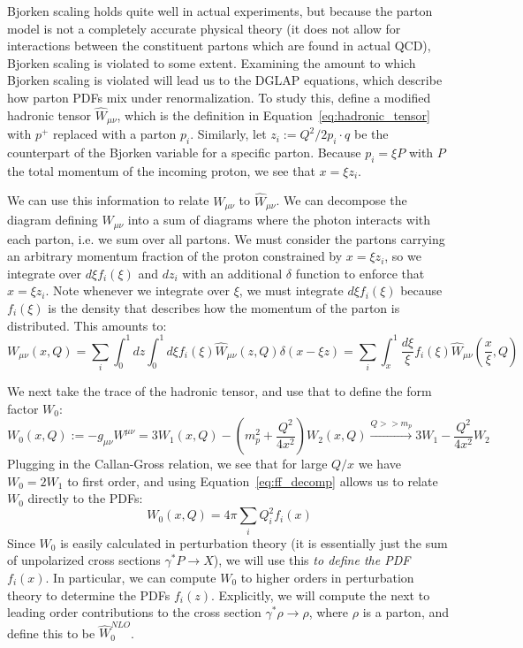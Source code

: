\documentclass[11pt, oneside]{article}   	%
\theoremstyle{definition}
\begin{document}
Bjorken scaling holds quite well in actual experiments, but because the parton model is not a completely accurate physical theory (it does not 
allow for interactions between the constituent partons which are found in actual QCD), Bjorken scaling is violated to some extent. Examining the 
amount to which Bjorken scaling is violated will lead us to the DGLAP equations, which describe how parton PDFs mix under renormalization. 
To study this, define a modified hadronic tensor $\hat{W}_{\mu\nu}$, which is the definition in Equation~\ref{eq:hadronic_tensor} with $p^+$ 
replaced with a parton $p_i$. Similarly, let $z_i := Q^2 / 2p_i\cdot q$ be the counterpart of the Bjorken variable for a specific parton. Because 
$p_i = \xi P$ with $P$ the total momentum of the incoming proton, we see that $x = \xi z_i$. 

We can use this information to relate $W_{\mu\nu}$ to $\hat W_{\mu\nu}$. We can decompose the diagram defining $W_{\mu\nu}$ into 
a sum of diagrams where the photon interacts with each parton, i.e. we sum over all partons. We must consider the partons carrying an 
arbitrary momentum fraction of the proton constrained by $x = \xi z_i$, so we integrate over $d\xi f_i(\xi)$ and $dz_i$ with an additional 
$\delta$ function to enforce that $x = \xi z_i$. Note whenever we integrate over $\xi$, we must integrate $d\xi f_i(\xi)$ because $f_i(\xi)$ 
is the density that describes how the momentum of the parton is distributed. This amounts to:
\begin{equation}
	W_{\mu\nu}(x, Q) = \sum_i\int_0^1 dz\int_0^1 d\xi f_i(\xi) \hat{W}_{\mu\nu}(z, Q)\delta(x - \xi z) = \sum_i\int_x^1 \frac{d\xi}{\xi} f_i(\xi)
	\hat{W}_{\mu\nu}\left(\frac{x}{\xi}, Q\right)
\end{equation}

We next take the trace of the hadronic tensor, and use that to define the form factor $W_0$:
\begin{equation}
	W_0(x, Q) := -g_{\mu\nu}W^{\mu\nu} = 3W_1(x, Q) - \left(m_p^2 + \frac{Q^2}{4x^2}\right)W_2(x, Q)\xrightarrow{Q >> m_p} 3W_1 
	- \frac{Q^2}{4x^2}W_2
\end{equation}
Plugging in the Callan-Gross relation, we see that for large $Q / x$ we have $W_0 = 2W_1$ to first order, and using Equation~\ref{eq:ff_decomp} 
allows us to relate $W_0$ directly to the PDFs:
\begin{equation}
	W_0(x, Q) = 4\pi\sum_i Q_i^2 f_i(x)
\end{equation}
Since $W_0$ is easily calculated in perturbation theory (it is essentially just the sum of unpolarized cross sections $\gamma^* P\rightarrow X$), we 
will use this \textit{to define the PDF $f_i(x)$}. In particular, we can compute $W_0$ to higher orders in perturbation theory to determine 
the PDFs $f_i(z)$. Explicitly, we will compute the next to leading order contributions to the cross section $\gamma^* \rho\rightarrow \rho$, where 
$\rho$ is a parton, and define this to be $\hat W_0^{NLO}$. 
\end{document}
